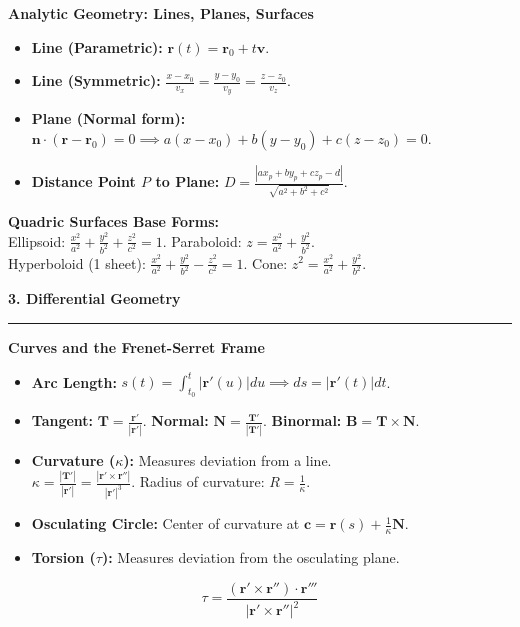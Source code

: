 \documentclass[10pt, landscape, twocolumn]{article}
\newcommand{\cheatsheetsection}[1]{
    \vspace{0.8em}
    {\color{themeblue}\large\bfseries #1} \par
    \vspace{-0.4em}
    {\color{themeblue}\rule{\linewidth}{1pt}} \par
    \vspace{0.3em}
}
\newcommand{\cheatsheetsubsection}[1]{
    \vspace{0.5em}
    {\color{themeblue}\normalsize\bfseries #1} \par
    \vspace{0.2em}
}
\begin{document}
\cheatsheetsubsection{Analytic Geometry: Lines, Planes, Surfaces}
\begin{itemize}[leftmargin=*, nosep]
    \item \textbf{Line (Parametric):} $\mathbf{r}(t) = \mathbf{r}_0 + t\mathbf{v}$.
    \item \textbf{Line (Symmetric):} $\frac{x-x_0}{v_x} = \frac{y-y_0}{v_y} = \frac{z-z_0}{v_z}$.
    \item \textbf{Plane (Normal form):} $\mathbf{n} \cdot (\mathbf{r} - \mathbf{r}_0) = 0 \implies a(x-x_0) + b(y-y_0) + c(z-z_0) = 0$.
    \item \textbf{Distance Point $P$ to Plane:} $D = \frac{|ax_p + by_p + cz_p - d|}{\sqrt{a^2+b^2+c^2}}$.
\end{itemize}
\textbf{Quadric Surfaces Base Forms:}\\
Ellipsoid: $\frac{x^2}{a^2} + \frac{y^2}{b^2} + \frac{z^2}{c^2} = 1$. Paraboloid: $z = \frac{x^2}{a^2} + \frac{y^2}{b^2}$.\\
Hyperboloid (1 sheet): $\frac{x^2}{a^2} + \frac{y^2}{b^2} - \frac{z^2}{c^2} = 1$. Cone: $z^2 = \frac{x^2}{a^2} + \frac{y^2}{b^2}$.

\cheatsheetsection{3. Differential Geometry}

\cheatsheetsubsection{Curves and the Frenet-Serret Frame}
\begin{itemize}[leftmargin=*, nosep]
    \item \textbf{Arc Length:} $s(t) = \int_{t_0}^t |\mathbf{r}'(u)| du \implies ds = |\mathbf{r}'(t)|dt$.
    \item \textbf{Tangent:} $\mathbf{T} = \frac{\mathbf{r}'}{|\mathbf{r}'|}$. \quad \textbf{Normal:} $\mathbf{N} = \frac{\mathbf{T}'}{|\mathbf{T}'|}$. \quad \textbf{Binormal:} $\mathbf{B} = \mathbf{T} \times \mathbf{N}$.
    \item \textbf{Curvature ($\kappa$):} Measures deviation from a line. \\ $\kappa = \frac{|\mathbf{T}'|}{|\mathbf{r}'|} = \frac{|\mathbf{r}' \times \mathbf{r}''|}{|\mathbf{r}'|^3}$. Radius of curvature: $R = \frac{1}{\kappa}$.
    \item \textbf{Osculating Circle:} Center of curvature at $\mathbf{c} = \mathbf{r}(s) + \frac{1}{\kappa}\mathbf{N}$.
    \item \textbf{Torsion ($\tau$):} Measures deviation from the osculating plane.
\end{itemize}
\[
\tau = \frac{(\mathbf{r}' \times \mathbf{r}'') \cdot \mathbf{r}'''}{|\mathbf{r}' \times \mathbf{r}''|^2}
\]
\end{document}
